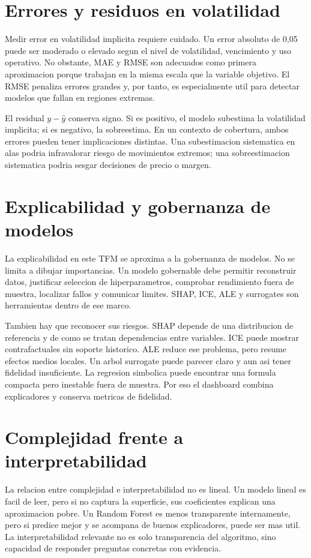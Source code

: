 \section{Errores y residuos en volatilidad}

Medir error en volatilidad implicita requiere cuidado. Un error absoluto de 0,05 puede ser moderado o elevado segun el nivel de volatilidad, vencimiento y uso operativo. No obstante, MAE y RMSE son adecuados como primera aproximacion porque trabajan en la misma escala que la variable objetivo. El RMSE penaliza errores grandes y, por tanto, es especialmente util para detectar modelos que fallan en regiones extremas.

El residual $y-\hat{y}$ conserva signo. Si es positivo, el modelo subestima la volatilidad implicita; si es negativo, la sobreestima. En un contexto de cobertura, ambos errores pueden tener implicaciones distintas. Una subestimacion sistematica en alas podria infravalorar riesgo de movimientos extremos; una sobreestimacion sistematica podria sesgar decisiones de precio o margen.

\section{Explicabilidad y gobernanza de modelos}

La explicabilidad en este TFM se aproxima a la gobernanza de modelos. No se limita a dibujar importancias. Un modelo gobernable debe permitir reconstruir datos, justificar seleccion de hiperparametros, comprobar rendimiento fuera de muestra, localizar fallos y comunicar limites. SHAP, ICE, ALE y surrogates son herramientas dentro de ese marco.

Tambien hay que reconocer sus riesgos. SHAP depende de una distribucion de referencia y de como se tratan dependencias entre variables. ICE puede mostrar contrafactuales sin soporte historico. ALE reduce ese problema, pero resume efectos medios locales. Un arbol surrogate puede parecer claro y aun asi tener fidelidad insuficiente. La regresion simbolica puede encontrar una formula compacta pero inestable fuera de muestra. Por eso el dashboard combina explicadores y conserva metricas de fidelidad.

\section{Complejidad frente a interpretabilidad}

La relacion entre complejidad e interpretabilidad no es lineal. Un modelo lineal es facil de leer, pero si no captura la superficie, sus coeficientes explican una aproximacion pobre. Un Random Forest es menos transparente internamente, pero si predice mejor y se acompana de buenos explicadores, puede ser mas util. La interpretabilidad relevante no es solo transparencia del algoritmo, sino capacidad de responder preguntas concretas con evidencia.

